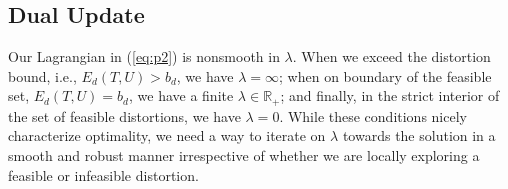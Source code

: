 
\subsection{Dual Update}
\label{sec:self_weighting}
\label{sec:dualUpdate}


%



Our Lagrangian in (\ref{eq:p2}) is nonsmooth in $\lambda$. When we exceed the distortion bound, i.e., $E_d(T,U) > b_d$, we have $\lambda = \infty$; when on boundary of the feasible set, $E_d(T,U) = b_d$, we have a finite $\lambda \in \mathbb{R_+}$; and finally, in the strict interior of the set of feasible distortions, we have $\lambda = 0$. While these conditions nicely characterize optimality, we need a way to iterate on $\lambda$ towards the solution in a smooth and robust manner irrespective of whether we are locally exploring a feasible or infeasible distortion. 

